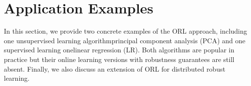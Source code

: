 \documentclass[11pt]{article}
\newtheorem{corollary}{Corollary}
\begin{document}



\section{Application Examples}
In this section, we provide two concrete examples of the ORL approach, including one unsupervised learning algorithm\textemdash principal component analysis (PCA) and one supervised learning one\textemdash  linear regression (LR). Both  algorithms are  popular in practice but their online learning versions with robustness guarantees are still absent. Finally, we also discuss an extension of ORL for distributed robust learning. 
\end{document}
